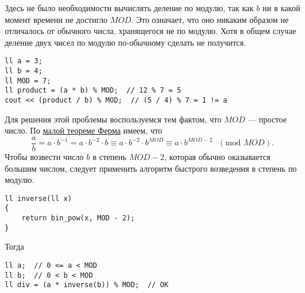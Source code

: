     Здесь не было необходимости вычислять деление по модулю, так как $b$ ни в какой момент времени не достигло $MOD$. Это означает, что оно никаким образом не отличалось от обычного числа, хранящегося не по модулю. Хотя в общем случае деление двух чисел по модулю по-обычному сделать не получится.
\begin{lstlisting}
ll a = 3;
ll b = 4;
ll MOD = 7;
ll product = (a * b) % MOD;  // 12 % 7 = 5
cout << (product / b) % MOD;  // (5 / 4) % 7 = 1 != a
\end{lstlisting}
    Для решения этой проблемы воспользуемся тем фактом, что $MOD$ --- простое число. По \href{https://ru.wikipedia.org/wiki/%D0%9C%D0%B0%D0%BB%D0%B0%D1%8F_%D1%82%D0%B5%D0%BE%D1%80%D0%B5%D0%BC%D0%B0_%D0%A4%D0%B5%D1%80%D0%BC%D0%B0#%D0%90%D0%BB%D1%8C%D1%82%D0%B5%D1%80%D0%BD%D0%B0%D1%82%D0%B8%D0%B2%D0%BD%D0%B0%D1%8F_%D1%84%D0%BE%D1%80%D0%BC%D1%83%D0%BB%D0%B8%D1%80%D0%BE%D0%B2%D0%BA%D0%B0}{малой теореме Ферма} имеем, что
    \[\frac{a}{b} = a \cdot b^{-1} = a \cdot b^{-2} \cdot b \equiv a \cdot b^{-2} \cdot b^{MOD} \equiv a \cdot b^{MOD - 2} \text{ } (\text{mod } MOD).\]
    Чтобы возвести число $b$ в степень $MOD - 2$, которая обычно оказывается большим числом, следует применить алгоритм быстрого возведения в степень по модулю. 
\newpage
\begin{lstlisting}
ll inverse(ll x)
{
    return bin_pow(x, MOD - 2);
}
\end{lstlisting}
    Тогда
\begin{lstlisting}
ll a;  // 0 <= a < MOD
ll b;  // 0 < b < MOD
ll div = (a * inverse(b)) % MOD;  // OK
\end{lstlisting}